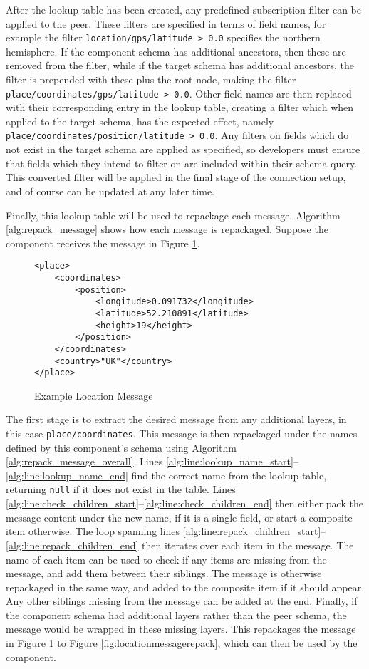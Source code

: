 \documentclass[12pt,twoside,notitlepage]{report}
\begin{document}
After the lookup table has been created, any predefined subscription filter can be applied to the peer. 
These filters are specified in terms of field names, for example the filter {\tt location/gps/latitude > 0.0} specifies the northern hemisphere. 
If the component schema has additional ancestors, then these are removed from the filter, while if the target schema has additional ancestors, the filter is prepended with these plus the root node, making the filter {\tt place/coordinates/gps/latitude > 0.0}.
Other field names are then replaced with their corresponding entry in the lookup table, creating a filter which when applied to the target schema, has the expected effect, namely {\tt place/coordinates/position/latitude > 0.0}.
Any filters on fields which do not exist in the target schema are applied as specified, so developers must ensure that fields which they intend to filter on are included within their schema query. 
This converted filter will be applied in the final stage of the connection setup, and of course can be updated at any later time. 

Finally, this lookup table will be used to repackage each message. 
Algorithm \ref{alg:repack_message} shows how each message is repackaged. 
Suppose the component receives the message in Figure \ref{fig:locationmessage}. 

\begin{figure}[tbh]
\begin{lstlisting}
<place>
	<coordinates>
		<position>
			<longitude>0.091732</longitude>
			<latitude>52.210891</latitude>
			<height>19</height>
		</position>
	</coordinates>
	<country>"UK"</country>
</place>
\end{lstlisting}
\caption{Example Location Message}
\label{fig:locationmessage}
\end{figure}

The first stage is to extract the desired message from any additional layers, in this case {\tt place/coordinates}. 
This message is then repackaged under the names defined by this component's schema using Algorithm \ref{alg:repack_message_overall}.
Lines \ref{alg:line:lookup_name_start}--\ref{alg:line:lookup_name_end} find the correct name from the lookup table, returning {\tt null} if it does not exist in the table. 
Lines \ref{alg:line:check_children_start}--\ref{alg:line:check_children_end} then either pack the message content under the new name, if it is a single field, or start a composite item otherwise. 
The loop spanning lines \ref{alg:line:repack_children_start}--\ref{alg:line:repack_children_end} then iterates over each item in the message. 
The name of each item can be used to check if any items are missing from the message, and add them between their siblings. 
The message is otherwise repackaged in the same way, and added to the composite item if it should appear. 
Any other siblings missing from the message can be added at the end. 
Finally, if the component schema had additional layers rather than the peer schema, the message would be wrapped in these missing layers. 
This repackages the message in Figure \ref{fig:locationmessage} to Figure \ref{fig:locationmessagerepack}, which can then be used by the component.  
\end{document}
